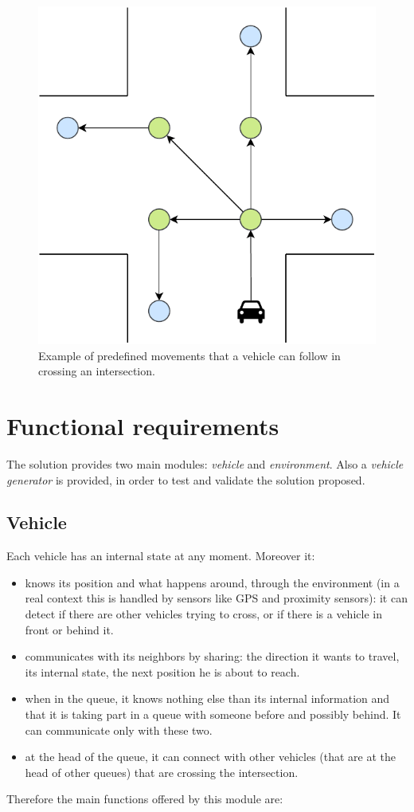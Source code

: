 \documentclass{memoir}
\begin{document}
\begin{figure}
	\centering
	\includegraphics[width=0.4\linewidth]{intersection_graph.pdf}
	\caption{Example of predefined movements that a vehicle can follow in crossing an intersection.}
	\label{fig:intersection-graph}
\end{figure}

\section{Functional requirements}
The solution provides two main modules: \emph{vehicle} and \emph{environment}. Also a \emph{vehicle generator} is provided, in order to test and validate the solution proposed.

\subsection{Vehicle}
Each vehicle has an internal state at any moment. Moreover it:

\begin{itemize}
	\item knows its position and what happens around, through the environment (in a real context this is handled by sensors like GPS and proximity sensors): it can detect if there are other vehicles trying to cross, or if there is a vehicle in front or behind it.
	\item communicates with its neighbors by sharing: the direction it wants to travel, its internal state, the next position he is about to reach.
	\item when in the queue, it knows nothing else than its internal information and that it is taking part in a queue with someone before and possibly behind. It can communicate only with these two.
	\item at the head of the queue, it can connect with other vehicles (that are at the head of other queues) that are crossing the intersection.
\end{itemize}
Therefore the main functions offered by this module are:
\end{document}
